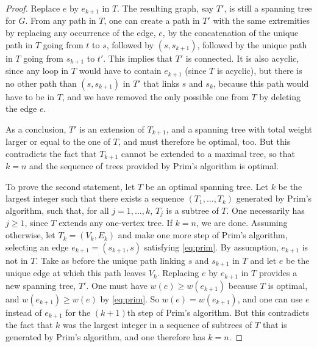 \begin{proof}
Replace $e$ by $e_{k+1}$ in $T$. The resulting graph,
say $T'$,
is still a spanning tree for $G$. From any path in $T$, one can create
a path in $T'$ with the same extremities by replacing any
occurrence of the edge, $e$, by the concatenation of the unique path
in $T$ going from $t$ to $s$, followed by $(s,s_{k+1})$, followed by the
unique path in $T$ going from $s_{k+1}$ to $t'$. This implies that $T'$ is
connected. It is also
acyclic, since any loop in $T$ would have to contain $e_{k+1}$ (since
$T$ is acyclic), but there is no
other path than $(s, s_{k+1})$ in $T'$ that links $s$ and $s_k$, because
this path would have to be in $T$, and we have removed the only
possible one from $T$ by deleting the edge $e$.

As a conclusion, $T'$ is an extension of $T_{k+1}$, and a spanning tree with total weight larger or
equal to the one of $T$, and must therefore be optimal, too. But this
contradicts the fact that $T_{k+1}$ cannot be extended to a maximal
tree, so that $k=n$ and the sequence of trees provided by Prim's
algorithm is optimal.

To prove the second statement, let $T$ be an optimal spanning
tree. Let $k$ be the largest integer such that there exists a sequence
$(T_1, \ldots, T_k)$ generated by Prim's algorithm, such that, for all
$j=1, \ldots, k$, $T_j$ is a subtree of $T$. One necessarily has
$j\geq 1$, since $T$ extends any one-vertex tree. If $k=n$, we are
done. Assuming otherwise, let $T_k = (V_k,
E_k)$ and make one more step
of Prim's algorithm, selecting an edge $e_{k+1} = (s_{k+1}, s)$
satisfying \cref{eq:prim}. By assumption, $e_{k+1}$ is not in
$T$. Take as before the unique path linking $s$ and $s_{k+1}$ in $T$
and let $e$ be the unique edge at which this path leaves
$V_k$. Replacing $e$ by $e_{k+1}$ in $T$ provides a new spanning tree, $T'$. One
must have $w(e) \geq w(e_{k+1})$ because $T$ is optimal, and
$w(e_{k+1}) \geq w(e)$ by \cref{eq:prim}. So $w(e) = w(e_{k+1})$, and
one can use $e$ instead of $e_{k+1}$ for the $(k+1)$th step of Prim's
algorithm. But this contradicts the fact that $k$ was the largest
integer in a sequence of subtrees of $T$ that is generated by Prim's
algorithm, and one therefore has $k=n$.
\end{proof}

